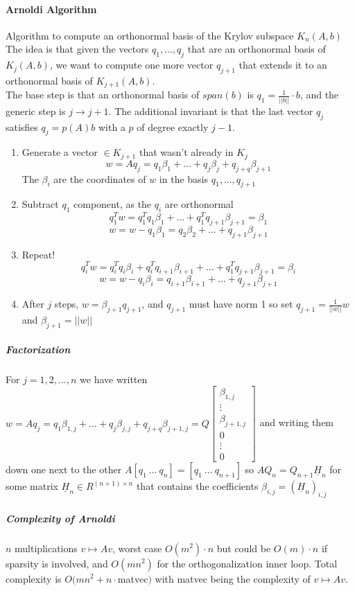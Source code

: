 \documentclass[10pt]{report}
\begin{document}
\paragraph{Arnoldi Algorithm} Algorithm to compute an orthonormal basis of the Krylov subspace $K_n(A,b)$\\
The idea is that given the vectors $q_1,\ldots,q_j$ that are an orthonormal basis of $K_j(A,b)$, we want to compute one more vector $q_{j+1}$ that extends it to an orthonormal basis of $K_{j+1}(A,b)$.\\
The base step is that an orthonormal basis of $span(b)$ is $q_1=\frac{1}{||b||}\cdot b$, and the generic step is $j\rightarrow j+1$. The additional invariant is that the last vector $q_j$ satisfies $q_j=p(A)b$ with a $p$ of degree exactly $j-1$.
\begin{enumerate}
	\item Generate a vector $\in K_{j+1}$ that wasn't already in $K_j$
	$$w = Aq_j = q_1\beta_1+\ldots + q_j\beta_j + q_{j+q}\beta_{j+1}$$
	The $\beta_i$ are the coordinates of $w$ in the basis $q_1,\ldots,q_{j+1}$
	\item Subtract $q_1$ component, as the $q_i$ are orthonormal
	$$q_1^Tw = q_1^Tq_1\beta_1+\ldots+q_1^Tq_{j+1}\beta_{j+1} = \beta_1$$
	$$w = w - q_1\beta_1 = q_2\beta_2 + \ldots + q_{j+1}\beta_{j+1}$$
	\item Repeat!
	$$q_i^Tw = q_i^Tq_i\beta_i + q_i^Tq_{i+1}\beta_{i+1}+\ldots+q_1^Tq_{j+1}\beta_{j+1} = \beta_i$$
	$$w = w - q_i\beta_i = q_{i+1}\beta_{i+1} + \ldots + q_{j+1}\beta_{j+1}$$
	\item After $j$ steps, $w = \beta_{j+1}q_{j+1}$, and $q_{j+1}$ must have norm 1 so set $q_{j+1}=\frac{1}{||w||}w$ and $\beta_{j+1}= ||w||$
\end{enumerate}
\subparagraph{Factorization} For $j=1,2,\ldots,n$ we have written $w = Aq_j = q_1\beta_{1,j}+\ldots + q_j\beta_{j,j} + q_{j+q}\beta_{j+1,j} = Q\left[\begin{array}{c}
\beta_{1,j}\\\vdots\\\beta_{j+1,j}\\0\\\vdots\\0
\end{array}\right]$ and writing them down one next to the other $A[q_1\:\ldots\:q_n] = [q_1\:\ldots\:q_{n+1}]$ so $AQ_n = Q_{n+1}\underline{H}_n$ for some matrix $\underline{H}_n\in R^{(n+1)\times n}$ that contains the coefficients $\beta_{i,j} = (\underline{H}_n)_{i,j}$
\subparagraph{Complexity of Arnoldi} $n$ multiplications $v\mapsto Av$, worst case $O(m^2)\cdot n$ but could be $O(m)\cdot n$ if sparsity is involved, and $O(mn^2)$ for the orthogonalization inner loop. Total complexity is $O(mn^2+n\cdot$matvec$)$ with matvec being the complexity of $v\mapsto Av$.
\end{document}
